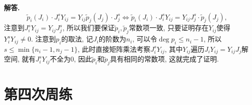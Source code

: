 \documentclass{article}
\newenvironment{solution}{\par\noindent\textbf{解答. }}{\par}
\begin{document}
\begin{solution}
$$
\tilde{p}_i\left( J_i \right) \cdot J_{i}^{s}Y_{ij}=Y_{ij}\tilde{p}_j\left( J_j \right) \cdot J_{j}^{s}\Longleftrightarrow \tilde{p}_i\left( J_i \right) \cdot J_{i}^{s}Y_{ij}=Y_{ij}J_{j}^{s}\cdot \tilde{p}_j\left( J_j \right) ,
$$
注意到$J_i^sY_{ij}=Y_{ij}J_j^s$, 所以我们要保证$\tilde{p}_i,\tilde{p}_j$常数项一致, 只要证明存在$Y_{ij}$使得$Y_i^sY_{ij}\ne 0$. 注意到$p_i$的取法, 记$J_i$的阶数为$n_i$, 可以令$\deg p_i\le n_i-1$, 所以$s\le\min\{n_i-1,n_j-1\}$, 此时直接矩阵乘法考察$J_i^sY_{ij}$, 其中$Y_{ij}$遍历$J_iY_{ij}=Y_{ij}J_j$解空间, 就有$J_i^sY_{ij}$不全为$0$, 因此$\tilde{p}_i$和$\tilde{p}_j$具有相同的常数项, 这就完成了证明.
\end{solution}
\newpage
\section{第四次周练}
\end{document}
